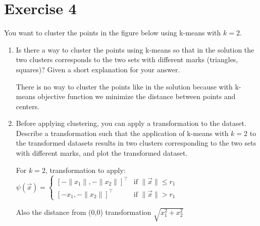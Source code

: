 \documentclass[a4paper,11pt,oneside]{book}
\begin{document}
\section{Exercise 4}
    You want to cluster the points in the figure below using k-means with $k = 2$.
    \begin{enumerate}
        \item Is there a way to cluster the points using k-means so that in the solution the two clusters corresponds to the two sets with different marks (triangles, squares)? Given a short explanation for your answer.
            \begin{solution}
                There is no way to cluster the points like in the solution because with k-means objective function we minimize the distance between points and centers.
            \end{solution}
        \item Before applying clustering, you can apply a transformation to the dataset. Describe a transformation such that the application of k-means with $k = 2$ to the transformed datasets results in two clusters corresponding to the two sets with different marks, and plot the transformed dataset.
            \begin{solution}
                For $k=2$, transformation to apply:
                $\psi(\vec{x}) = \begin{cases} [-\|x_1\|, -\|x_2\|]^\top & \text{if } \|\vec{x}\| \leq r_1 \\ 
                [-x_1, -\|x_2\|]^\top & \text{if } \|\vec{x}\| > r_1 \end{cases}$
                
                Also the distance from (0,0) transformation $\sqrt{x_1^2 + x_2^2}$


\end{solution}
\end{enumerate}
\end{document}
